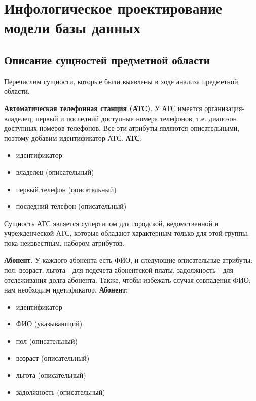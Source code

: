 \documentclass{report}
\begin{document}
\chapter{Инфологическое проектирование модели базы данных}

\section{Описание сущностей предметной области}
Перечислим сущности, которые были выявлены в ходе анализа предметной области.

\textbf{Автоматическая телефонная станция (АТС)}. У АТС имеется 
организация-владелец, первый и последний доступные номера телефонов, 
т.е. диапозон доступных номеров телефонов. 
Все эти атрибуты являются описательными, поэтому добавим идентификатор АТС. 
\newline\textbf{АТС}:
\begin{itemize}
    \item идентификатор
    \item владелец (описательный)
    \item первый телефон (описательный)
    \item последний телефон (описательный)
\end{itemize}
Сущность АТС является супертипом для городской, 
ведомственной и учрежденческой АТС, которые обладают характерным только 
для этой группы, пока неизвестным, набором атрибутов.

\textbf{Абонент}. У каждого абонента есть ФИО, 
и следующие описательные атрибуты: пол, возраст, льгота - для подсчета 
абонентской платы, задолжность - для отслеживания долга абонента. 
Также, чтобы избежать случая совпадения ФИО, нам необходим идетификатор.
\newline\textbf{Абонент}:
\begin{itemize}
    \item идентификатор
    \item ФИО (указывающий)
    \item пол (описательный)
    \item возраст (описательный)
    \item льгота (описательный)
    \item задолжность (описательный)
\end{itemize}
\end{document}

